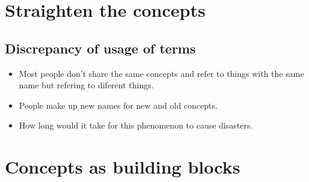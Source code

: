 \section{Straighten the concepts}
\subsection{Discrepancy of usage of terms}

\begin{itemize}
    \item Most people don't share the same concepts and refer to things with the same name but refering to diferent things.
    \item People make up new names for new and old concepts.
    \item How long would it take for this phenomenon to cause disasters.
\end{itemize}

\section{Concepts as building blocks}


